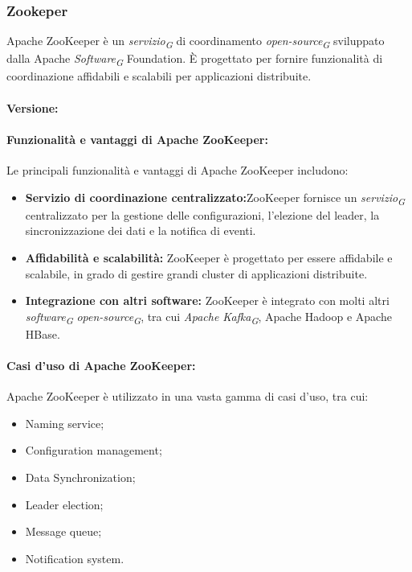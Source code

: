 \subsubsection{Zookeper}
Apache ZooKeeper è un \textit{servizio}\textsubscript{\textit{G}} di coordinamento \textit{open-source}\textsubscript{\textit{G}} sviluppato dalla Apache \textit{Software}\textsubscript{\textit{G}} Foundation. È progettato per fornire funzionalità di coordinazione affidabili e scalabili per applicazioni distribuite.

\paragraph*{Versione:}

\paragraph*{Funzionalità e vantaggi di Apache ZooKeeper:}
Le principali funzionalità e vantaggi di Apache ZooKeeper includono:
\begin{itemize}
    \item \textbf{Servizio di coordinazione centralizzato:}ZooKeeper fornisce un \textit{servizio}\textsubscript{\textit{G}} centralizzato per la gestione delle configurazioni, l'elezione del leader, la sincronizzazione dei dati e la notifica di eventi.
    \item \textbf{Affidabilità e scalabilità:} ZooKeeper è progettato per essere affidabile e scalabile, in grado di gestire grandi cluster di applicazioni distribuite.
    \item \textbf{Integrazione con altri software:} ZooKeeper è integrato con molti altri \textit{software}\textsubscript{\textit{G}} \textit{open-source}\textsubscript{\textit{G}}, tra cui \textit{Apache Kafka}\textsubscript{\textit{G}}, Apache Hadoop e Apache HBase.
\end{itemize}
 
\paragraph*{Casi d'uso di Apache ZooKeeper:}

Apache ZooKeeper è utilizzato in una vasta gamma di casi d'uso, tra cui:
\begin{itemize}
    \item Naming service;
    \item Configuration management;
    \item Data Synchronization;
    \item Leader election;
    \item Message queue;
    \item Notification system.
\end{itemize}

